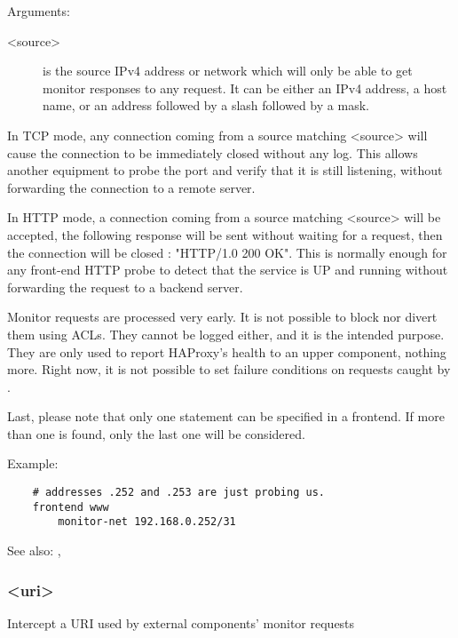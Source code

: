   Arguments:
\begin{description}
\item[ <source>]
              is the source IPv4 address or network which will only be able to
              get monitor responses to any request. It can be either an IPv4
              address, a host name, or an address followed by a slash \chr{/}
              followed by a mask.
\end{description}

  In TCP mode, any connection coming from a source matching <source> will cause
  the connection to be immediately closed without any log. This allows another
  equipment to probe the port and verify that it is still listening, without
  forwarding the connection to a remote server.

  In HTTP mode, a connection coming from a source matching <source> will be
  accepted, the following response will be sent without waiting for a request,
  then the connection will be closed : "HTTP/1.0 200 OK". This is normally
  enough for any front-end HTTP probe to detect that the service is UP and
  running without forwarding the request to a backend server.

  Monitor requests are processed very early. It is not possible to block nor
  divert them using ACLs. They cannot be logged either, and it is the intended
  purpose. They are only used to report HAProxy's health to an upper component,
  nothing more. Right now, it is not possible to set failure conditions on
  requests caught by .

  Last, please note that only one  statement can be specified in
  a frontend. If more than one is found, only the last one will be considered.

  Example:
\begin{verbatim}
    # addresses .252 and .253 are just probing us.
    frontend www
        monitor-net 192.168.0.252/31
\end{verbatim}

  See also: , 

\subsubsection[monitor-uri]{ <uri>}

  Intercept a URI used by external components' monitor requests


